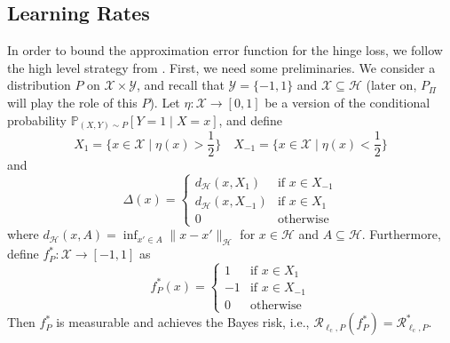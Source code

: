 \documentclass[letterpaper]{article} %
\newcommand{\Pb}{\mathbb{P}}
\newcommand{\distr}{\sim}
\newcommand{\hs}[1]{\mathcal{#1}} %
\newcommand{\inputSet}{\mathcal{X}} %
\newcommand{\outputSet}{\mathcal{Y}} %
\newcommand{\risk}{\mathcal{R}} %
\newcommand{\Risk}[2]{\risk_{{#1},{#2}}} %
\newcommand{\RiskBayes}[2]{\risk_{{#1},{#2}}^\ast} %
\newcommand{\hilbertianHS}{\hs{H}} %
\newcommand{\hilbertianEmbed}{\Pi} %
\newcommand{\ellClass}{\ell_{\mathrm{c}}} %
\begin{document}
\subsection{Learning Rates} \label{sec:distrslt:learningRatesClassification}
In order to bound the approximation error function for the hinge loss, we follow the high level strategy from \cite{steinwart2007fast}.
First, we need some preliminaries.
We consider a distribution $P$ on $\inputSet\times\outputSet$, and recall that $\outputSet=\{-1,1\}$ and $\inputSet\subseteq\hilbertianHS$ (later on, $P_\hilbertianEmbed$ will play the role of this $P$).
Let $\eta: \inputSet\rightarrow[0,1]$ be a version of the conditional probability $\Pb_{(X,Y)\distr P}[Y=1 \mid X=x]$,
and define
\begin{equation*}
    X_1=\{x\in\inputSet \mid \eta(x) > \frac12 \}
    \quad
    X_{-1}=\{x\in\inputSet \mid \eta(x)<\frac12\}
\end{equation*}
and
\begin{equation*}
    \Delta(x) = \begin{cases}
        d_\hilbertianHS(x, X_1) & \text{if } x \in X_{-1} \\  %
        d_\hilbertianHS(x, X_{-1}) & \text{if } x \in X_1 \\ %
        0 & \text{otherwise}
    \end{cases}
\end{equation*}
where $d_\hilbertianHS(x,A)=\inf_{x'\in A} \|x-x'\|_\hilbertianHS$ for $x\in\hilbertianHS$ and $A\subseteq\hilbertianHS$.
Furthermore, define $f_P^\ast: \inputSet\rightarrow[-1,1]$ as
\begin{equation*}
    f_P^\ast(x) = \begin{cases}
        1 & \text{if } x \in X_1 \\
        -1 & \text{if } x \in X_{-1} \\
        0 & \text{otherwise}
    \end{cases}
\end{equation*}
Then $f_P^\ast$ is measurable and achieves the Bayes risk, i.e., $\Risk{\ellClass}{P}(f_P^\ast)=\RiskBayes{\ellClass}{P}$.
\end{document}
